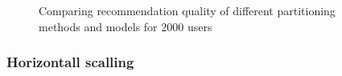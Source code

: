 \begin{figure}[h!]
    \centering
    
    \caption{Comparing recommendation quality of different partitioning methods and models for 2000 users}
    \label{plot:hyperparameter-recommendation-quality-2000-users}
\end{figure}



\subsubsection{Horizontall scalling}
\label{subsubsec:eval-horizontall-scalling}

